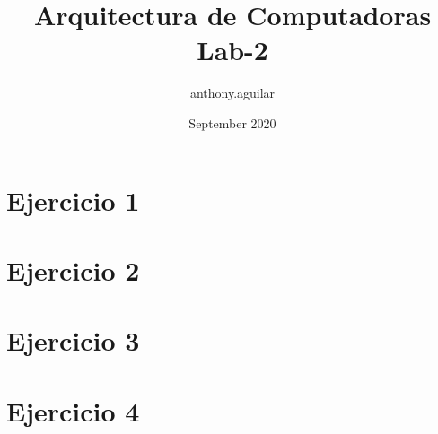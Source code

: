 \documentclass{article}
\title{Arquitectura de Computadoras Lab-2}
\author{anthony.aguilar }
\date{September 2020}
\begin{document}
\maketitle
\newpage
%

\section*{Ejercicio 1}

\newpage

\section*{Ejercicio 2}

\newpage

\section*{Ejercicio 3}

\newpage

\section*{Ejercicio 4}

\end{document}
